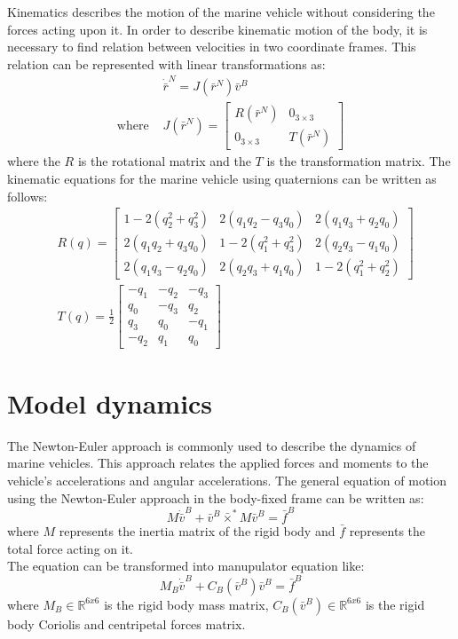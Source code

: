     Kinematics describes the motion of the marine vehicle without considering the forces acting upon it.
    In order to describe kinematic motion of the body, it is necessary to find relation between velocities in two coordinate frames.
    This relation can be represented with linear transformations as:
    $$
    \begin{aligned}
        & \dot{\bar{r}}^N=J(\bar{r}^N) \bar{v}^B \\
        \text{where } & J(\bar{r}^N)=\left[\begin{array}{cc}
        R(\bar{r}^N) & 0_{3 \times 3} \\
        0_{3 \times 3} & T(\bar{r}^N)
        \end{array}\right]
    \end{aligned}
    $$
    where the $R$ is the rotational matrix and the $T$ is the transformation matrix. 
    The kinematic equations for the marine vehicle using quaternions can be written as follows:
    $$
    \begin{aligned}
    & R(q)=\left[\begin{array}{ccc}
        1-2\left(q_2^2+q_3^2\right) & 2\left(q_1 q_2-q_3 q_0\right) & 2\left(q_1 q_3+q_2 q_0\right) \\
        2\left(q_1 q_2+q_3 q_0\right) & 1-2\left(q_1^2+q_3^2\right) & 2\left(q_2 q_3-q_1 q_0\right) \\
        2\left(q_1 q_3-q_2 q_0\right) & 2\left(q_2 q_3+q_1 q_0\right) & 1-2\left(q_1^2+q_2^2\right)
        \end{array}\right]\\
    & T(q)=\frac{1}{2}\left[\begin{array}{rrr}
        -q_1 & -q_2 & -q_3 \\
        q_0 & -q_3 & q_2 \\
        q_3 & q_0 & -q_1 \\
        -q_2 & q_1 & q_0
        \end{array}\right]
    \end{aligned}
    $$

\section{Model dynamics}

    The Newton-Euler approach is commonly used to describe the dynamics of marine vehicles.
    This approach relates the applied forces and moments to the vehicle's accelerations and angular accelerations.
    The general equation of motion using the Newton-Euler approach in the body-fixed frame can be written as:
    $$
    M\dot{\bar{v}}^B+\bar{v}^B\bar{\times}^*M\bar{v}^B=\bar{f}^B
    $$
    where $M$ represents the inertia matrix of the rigid body and 
    $\bar{f}$ represents the total force acting on it.\\
    The equation can be transformed into manupulator equation like:
    $$
     M_B \dot{\bar{v}}^B+C_B(\bar{v}^B) \bar{v}^B
    = \bar{f}^B
    $$
    where
    $M_B \in \mathbb{R}^{6 x 6}$ is the rigid body mass matrix,
    $C_B(\bar{v}^B) \in \mathbb{R}^{6 x 6}$ is the rigid body Coriolis and centripetal forces matrix.

